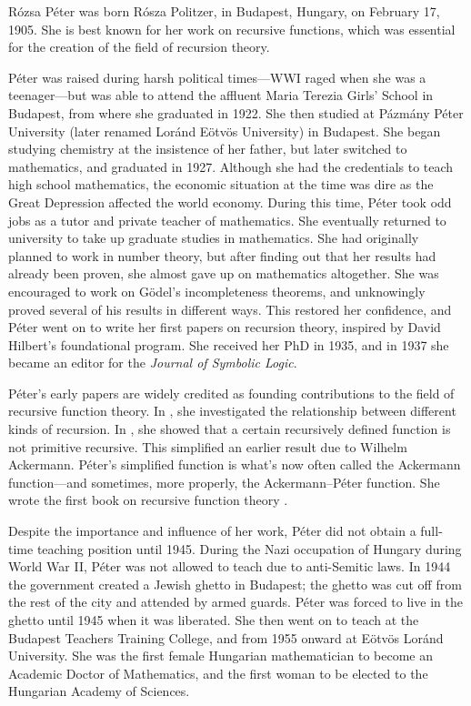 \documentclass[../../../include/open-logic-section]{subfiles}
\begin{document}


 
R\'ozsa P\'eter was born R\'osza Politzer, in Budapest, Hungary, on
February 17, 1905. She is best known for her work on recursive
functions, which was essential for the creation of the field of
recursion theory.

P\'eter was raised during harsh political times---WWI raged when she
was a teenager---but was able to attend the affluent Maria Terezia
Girls' School in Budapest, from where she graduated in 1922.  She then
studied at P\'azm\'any P\'eter University (later renamed Lor\'and
E\"otv\"os University) in Budapest. She began studying chemistry at
the insistence of her father, but later switched to mathematics, and
graduated in 1927. Although she had the credentials to teach high
school mathematics, the economic situation at the time was dire as the
Great Depression affected the world economy. During this time, P\'eter
took odd jobs as a tutor and private teacher of mathematics. She
eventually returned to university to take up graduate studies in
mathematics.  She had originally planned to work in number theory, but
after finding out that her results had already been proven, she almost
gave up on mathematics altogether. She was encouraged to work on
G\"odel's incompleteness theorems, and unknowingly proved several of
his results in different ways. This restored her confidence, and
P\'eter went on to write her first papers on recursion theory,
inspired by David Hilbert's foundational program. She received her PhD
in 1935, and in 1937 she became an editor for the \emph{Journal of
  Symbolic Logic}.

P\'eter's early papers are widely credited as founding contributions
to the field of recursive function theory. In \cite{Peter1935a}, she
investigated the relationship between different kinds of recursion.
In \cite{Peter1935b}, she showed that a certain recursively defined
function is not primitive recursive. This simplified an earlier result
due to Wilhelm Ackermann. P\'eter's simplified function is what's now
often called the Ackermann function---and sometimes, more properly,
the Ackermann--P\'eter function. She wrote the first book on recursive
function theory \citep{Peter1951}.

Despite the importance and influence of her work, P\'eter did not
obtain a full-time teaching position until 1945. During the Nazi
occupation of Hungary during World War II, P\'eter was not allowed to
teach due to anti-Semitic laws. In 1944 the government created a
Jewish ghetto in Budapest; the ghetto was cut off from the rest of the
city and attended by armed guards. P\'eter was forced to live in the
ghetto until 1945 when it was liberated. She then went on to teach at
the Budapest Teachers Training College, and from 1955 onward at E\"otv\"os
Lor\'and University. She was the first female Hungarian mathematician
to become an Academic Doctor of Mathematics, and the first woman to be
elected to the Hungarian Academy of Sciences.
\end{document}
